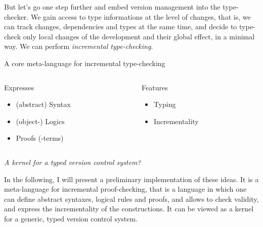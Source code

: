 \documentclass[ignorenonframetext,red]{beamer}
\begin{document}
But let's go one step further and embed version management into the
type-checker. We gain access to type informations at the level of
changes, that is, we can track changes, dependencies and types at the
same time, and decide to type-check only local changes of the
development and their global effect, in a minimal way. We can perform
\emph{incremental type-checking}.

\begin{frame}{A core meta-language for incremental type-checking}
  \begin{columns}[t]
    \begin{column}{0.5\textwidth}
      \begin{block}{Expresses}
        \begin{itemize}
        \item (abstract) Syntax
        \item (object-) Logics
        \item Proofs (-terms)
        \end{itemize}
      \end{block}
    \end{column}
    \begin{column}{0.5\textwidth}
      \begin{block}{Features}
        \begin{itemize}
        \item Typing
        \item Incrementality
        \end{itemize}
      \end{block}
    \end{column}
  \end{columns}
  \vspace{2em}
  \begin{center}
    \emph{A kernel for a typed version control system?}
  \end{center}
\end{frame}

In the following, I will present a preliminary implementation of these
ideas. It is a meta-language for incremental proof-checking, that is a
language in which one can define abstract syntaxes, logical rules and
proofs, and allows to check validity, and express the incrementality
of the constructions. It can be viewed as a kernel for a generic,
typed version control system.
\end{document}
